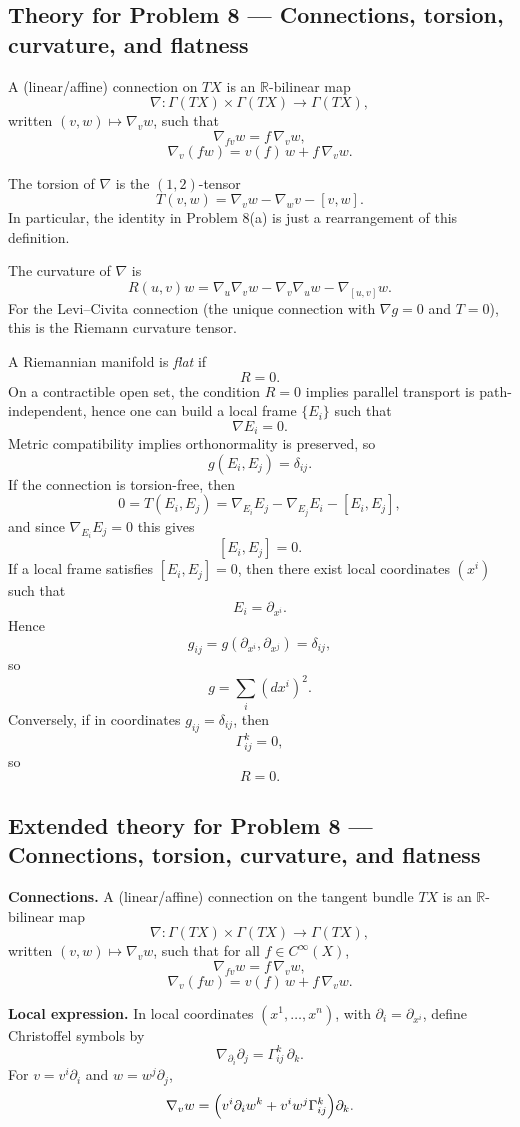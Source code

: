 \documentclass[12pt,a4paper]{article}
\theoremstyle{plain}
\theoremstyle{definition}      %
\begin{document}
\subsection*{Theory for Problem 8 — Connections, torsion, curvature, and flatness}

A (linear/affine) connection on $TX$ is an $\mathbb{R}$-bilinear map
\[
\nabla:\Gamma(TX)\times\Gamma(TX)\to\Gamma(TX),
\]
written $(v,w)\mapsto \nabla_v w$, such that
\[
\nabla_{fv}w=f\,\nabla_v w,
\]
\[
\nabla_v(fw)=v(f)\,w+f\,\nabla_v w.
\]

The torsion of $\nabla$ is the $(1,2)$-tensor
\[
T(v,w)=\nabla_v w-\nabla_w v-[v,w].
\]
In particular, the identity in Problem 8(a) is just a rearrangement of this definition.

The curvature of $\nabla$ is
\[
R(u,v)w=\nabla_u\nabla_v w-\nabla_v\nabla_u w-\nabla_{[u,v]}w.
\]
For the Levi--Civita connection (the unique connection with $\nabla g=0$ and $T=0$), this is the Riemann curvature tensor.

A Riemannian manifold is \emph{flat} if
\[
R=0.
\]
On a contractible open set, the condition $R=0$ implies parallel transport is path-independent, hence one can build a local frame $\{E_i\}$ such that
\[
\nabla E_i=0.
\]
Metric compatibility implies orthonormality is preserved, so
\[
g(E_i,E_j)=\delta_{ij}.
\]
If the connection is torsion-free, then
\[
0=T(E_i,E_j)=\nabla_{E_i}E_j-\nabla_{E_j}E_i-[E_i,E_j],
\]
and since $\nabla_{E_i}E_j=0$ this gives
\[
[E_i,E_j]=0.
\]
If a local frame satisfies $[E_i,E_j]=0$, then there exist local coordinates $(x^i)$ such that
\[
E_i=\partial_{x^i}.
\]
Hence
\[
g_{ij}=g(\partial_{x^i},\partial_{x^j})=\delta_{ij},
\]
so
\[
g=\sum_i (dx^i)^2.
\]
Conversely, if in coordinates $g_{ij}=\delta_{ij}$, then
\[
\Gamma^k_{ij}=0,
\]
so
\[
R=0.
\]

\subsection*{Extended theory for Problem 8 — Connections, torsion, curvature, and flatness}

\textbf{Connections.}
A (linear/affine) connection on the tangent bundle $TX$ is an $\mathbb{R}$-bilinear map
\[
\nabla:\Gamma(TX)\times\Gamma(TX)\to\Gamma(TX),
\]
written $(v,w)\mapsto \nabla_v w$, such that for all $f\in C^\infty(X)$,
\[
\nabla_{fv}w=f\,\nabla_v w,
\]
\[
\nabla_v(fw)=v(f)\,w+f\,\nabla_v w.
\]

\textbf{Local expression.}
In local coordinates $(x^1,\dots,x^n)$, with $\partial_i=\partial_{x^i}$, define Christoffel symbols by
\[
\nabla_{\partial_i}\partial_j=\Gamma^k_{ij}\,\partial_k.
\]
For $v=v^i\partial_i$ and $w=w^j\partial_j$,
\[
\nabla_v w
=
\Bigl(v^i\partial_i w^k + v^i w^j \Gamma^k_{ij}\Bigr)\partial_k.
\]
\end{document}
